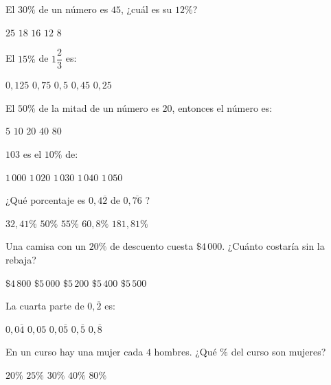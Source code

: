 \documentclass[sin fecha]{srs}
\begin{document}
\separador
\begin{preguntas}[after-item-skip=1cm]

\pregunta El $30\%$ de un número es $45$, ¿cuál es su $12\%$?
\begin{vertical}
\alternativa $25$
\alternativa $18$
\alternativa $16$
\alternativa $12$
\alternativa $8$
\end{vertical}

\pregunta El $15\%$ de $1\dfrac{2}{3}$ es:
\begin{vertical}
\alternativa $0,125$
\alternativa $0,75$
\alternativa $0,5$
\alternativa $0,45$
\alternativa $0,25$
\end{vertical}


\pregunta El $50\%$ de la mitad de un número es $20$, entonces el número es:
\begin{vertical}
\alternativa $5$
\alternativa $10$
\alternativa $20$
\alternativa $40$
\alternativa $80$
\end{vertical}

\pregunta $103$ es el $10\%$ de:
\begin{vertical}
\alternativa $1\,000$
\alternativa $1\,020$
\alternativa $1\,030$
\alternativa $1\,040$
\alternativa $1\,050$
\end{vertical}

\pregunta ¿Qué porcentaje es $0,4\overline{2}$ de $0,\overline{76}$ ?
\begin{vertical}
\alternativa $32,41\%$
\alternativa $50\%$
\alternativa $55\%$
\alternativa $60,8\%$
\alternativa $181,81\%$
\end{vertical}

\pregunta Una camisa con un $20\%$ de descuento cuesta $\$4\,000$. ¿Cuánto costaría sin la rebaja?
\begin{vertical}
\alternativa $\$4\,800$
\alternativa $\$5\,000$
\alternativa $\$5\,200$
\alternativa $\$5\,400$
\alternativa $\$5\,500$
\end{vertical}

\pregunta La cuarta parte de $0,\overline{2}$ es:
\begin{vertical}
\alternativa $0,0\overline{4}$
\alternativa $0,05$
\alternativa $0,0\overline{5}$
\alternativa $0,\overline{5}$
\alternativa $0,\overline{8}$
\end{vertical}

\pregunta En un curso hay una mujer cada $4$ hombres. ¿Qué $\%$ del curso son mujeres?
\begin{vertical}
\alternativa $20\%$
\alternativa $25\%$
\alternativa $30\%$
\alternativa $40\%$
\alternativa $80\%$
\end{vertical}


\end{preguntas}
\end{document}

